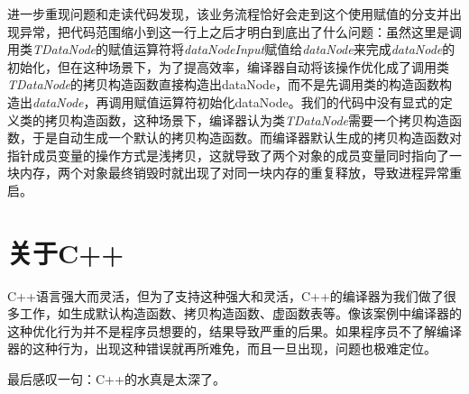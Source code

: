 \documentclass[a4paper, 11pt, titlepage]{article}
\begin{document}
进一步重现问题和走读代码发现，该业务流程恰好会走到这个使用赋值的分支并出现异常，把代码范围缩小到这一行上之后才明白到底出了什么问题：虽然这里是调用类\emph{TDataNode}的赋值运算符将\emph{dataNodeInput}赋值给\emph{dataNode}来完成\emph{dataNode}的初始化，但在这种场景下，为了提高效率，编译器自动将该操作优化成了调用类\emph{TDataNode}的拷贝构造函数直接构造出dataNode，而不是先调用类的构造函数构造出\emph{dataNode}，再调用赋值运算符初始化dataNode。我们的代码中没有显式的定义类的拷贝构造函数，这种场景下，编译器认为类\emph{TDataNode}需要一个拷贝构造函数，于是自动生成一个默认的拷贝构造函数。而编译器默认生成的拷贝构造函数对指针成员变量的操作方式是浅拷贝，这就导致了两个对象的成员变量同时指向了一块内存，两个对象最终销毁时就出现了对同一块内存的重复释放，导致进程异常重启。

\section{关于C++}
C++语言强大而灵活，但为了支持这种强大和灵活，C++的编译器为我们做了很多工作，如生成默认构造函数、拷贝构造函数、虚函数表等。像该案例中编译器的这种优化行为并不是程序员想要的，结果导致严重的后果。如果程序员不了解编译器的这种行为，出现这种错误就再所难免，而且一旦出现，问题也极难定位。

{\color{blue}最后感叹一句：C++的水真是太深了}。
\end{document}
